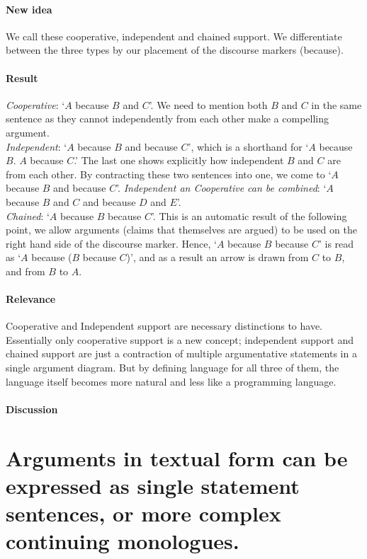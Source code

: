 \documentclass{article}
\let\stdsection\section
\renewcommand\section{\newpage\stdsection}
\begin{document}
\paragraph{New idea} We call these cooperative, independent and chained support. We differentiate between the three types by our placement of the discourse markers (because).
\paragraph{Result}
\emph{Cooperative}: `$A$ because $B$ and $C$'. We need to mention both $B$ and $C$ in the same sentence as they cannot independently from each other make a compelling argument.\\
\emph{Independent}: `$A$ because $B$ and because $C$', which is a shorthand for `$A$ because $B$. $A$ because $C$.' The last one shows explicitly how independent $B$ and $C$ are from each other. By contracting these two sentences into one, we come to `$A$ because $B$ and because $C$'. \emph{Independent an Cooperative can be combined}: `$A$ because $B$ and $C$ and because $D$ and $E$'.\\
\emph{Chained}: `$A$ because $B$ because $C$'. This is an automatic result of the following point, we allow arguments (claims that themselves are argued) to be used on the right hand side of the discourse marker. Hence, `$A$ because $B$ because $C$' is read as `$A$ because ($B$ because $C$)', and as a result an arrow is drawn from $C$ to $B$, and from $B$ to $A$.
\paragraph{Relevance} Cooperative and Independent support are necessary distinctions to have. Essentially only cooperative support is a new concept; independent support and chained support are just a contraction of multiple argumentative statements in a single argument diagram. But by defining language for all three of them, the language itself becomes more natural and less like a programming language.
\paragraph{Discussion} 

\section{Arguments in textual form can be expressed as single statement sentences, or more complex continuing monologues.}
\end{document}
